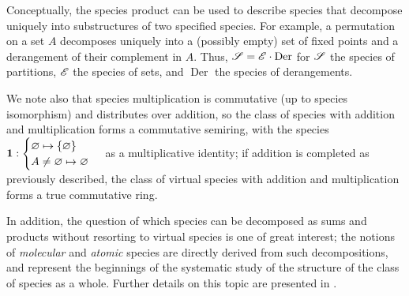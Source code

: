 \documentclass[sectionflow,singlespace,twoside,boldmathhdr,draft]{brandiss} %
\numberwithin{section}{chapter}
\numberwithin{figure}{chapter}
\begin{document}
Conceptually, the species product can be used to describe species that decompose uniquely into substructures of two specified species.
For example, a permutation on a set $A$ decomposes uniquely into a (possibly empty) set of fixed points and a derangement of their complement in $A$.
Thus, $\mathscr{S} = \mathscr{E} \cdot \operatorname{Der}$ for $\mathscr{S}$ the species of partitions, $\mathscr{E}$ the species of sets, and $\operatorname{Der}$ the species of derangements.

We note also that species multiplication is commutative (up to species isomorphism) and distributes over addition, so the class of species with addition and multiplication forms a commutative semiring, with the species $\mathbf{1}: \begin{cases} \varnothing \mapsto \left\{ {\varnothing} \right\} \\ A \neq \varnothing \mapsto \varnothing \end{cases}$ as a multiplicative identity; if addition is completed as previously described, the class of virtual species with addition and multiplication forms a true commutative ring.

In addition, the question of which species can be decomposed as sums and products without resorting to virtual species is one of great interest; the notions of \emph{molecular} and \emph{atomic} species are directly derived from such decompositions, and represent the beginnings of the systematic study of the structure of the class of species as a whole.
Further details on this topic are presented in \cite[\S 2.6]{bll:species}.
\end{document}
